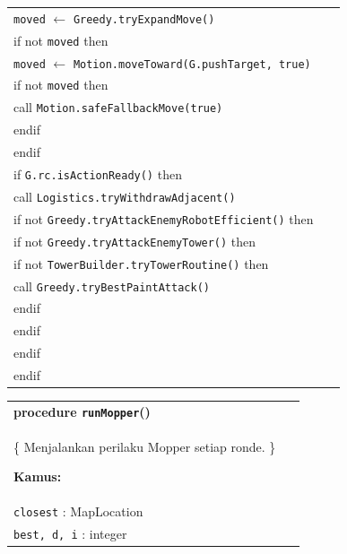 \documentclass{article}
\newenvironment{pseudobox}
{
\centering
\begin{longtable}{|p{0.94\linewidth}|}
\hline
}
{
\\ \hline
\end{longtable}
\vspace{0.05cm}
}
\begin{document}
\begin{enumerate}[label=\alph*.]
\begin{enumerate}[label=\alph*.]
\begin{pseudobox}
\hspace*{1.5em}\texttt{moved} $\leftarrow$ \texttt{Greedy.tryExpandMove()} \\
\hspace*{1.5em}if not \texttt{moved} then \\
\hspace*{3em}\texttt{moved} $\leftarrow$ \texttt{Motion.moveToward(G.pushTarget, true)} \\
\hspace*{3em}if not \texttt{moved} then \\
\hspace*{4.5em}call \texttt{Motion.safeFallbackMove(true)} \\
\hspace*{3em}endif \\
\hspace*{1.5em}endif \\

\hspace*{1.5em}if \texttt{G.rc.isActionReady()} then \\
\hspace*{3em}call \texttt{Logistics.tryWithdrawAdjacent()} \\

\hspace*{3em}if not \texttt{Greedy.tryAttackEnemyRobotEfficient()} then \\
\hspace*{4.5em}if not \texttt{Greedy.tryAttackEnemyTower()} then \\
\hspace*{6em}if not \texttt{TowerBuilder.tryTowerRoutine()} then \\
\hspace*{7.5em}call \texttt{Greedy.tryBestPaintAttack()} \\
\hspace*{6em}endif \\
\hspace*{4.5em}endif \\
\hspace*{3em}endif \\
\hspace*{1.5em}endif
\end{pseudobox}

\begin{pseudobox}
\textbf{procedure \texttt{runMopper}()} \\
\{ Menjalankan perilaku Mopper setiap ronde. \}

\textbf{Kamus:} \\
\hspace*{1.5em}\texttt{closest} : MapLocation \\
\hspace*{1.5em}\texttt{best, d, i} : integer


\end{pseudobox}
\end{enumerate}
\end{enumerate}
\end{document}
